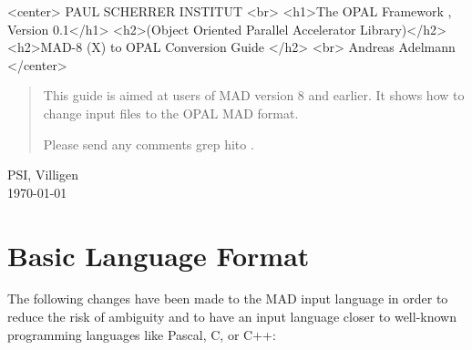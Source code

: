 \documentclass{article}
\newcommand{\documentlabel}{PSI - GFA (AMAS)}
\begin{document}
\begin{titlepage}

\begin{htmlonly}
\begin{rawhtml}
<center>
PAUL SCHERRER INSTITUT
<br>
<h1>The OPAL Framework , Version 0.1</h1>
<h2>(Object Oriented Parallel Accelerator Library)</h2>
<h2>MAD-8 (X) to OPAL Conversion Guide </h2>
<br>
Andreas Adelmann
</center>
\end{rawhtml}
\end{htmlonly}
\begin{quotation}
This guide is aimed at users of MAD version 8 and earlier.
It shows how to change input files to the OPAL MAD format.

Please send any comments grep hito 
.
\end{quotation}
\vfill
\begin{center}
PSI, Villigen \\
\today
\end{center}
\end{titlepage}

\tableofcontents

\section{Basic Language Format}
The following changes have been made to the MAD input language in order
to reduce the risk of ambiguity and to have an input language closer to
well-known programming languages like Pascal, C, or C++:
\end{document}
